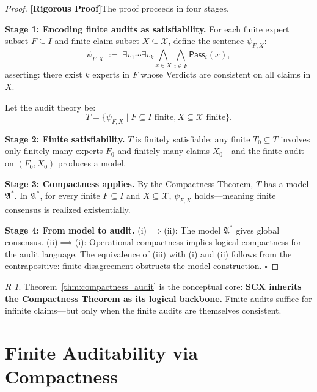 \documentclass[12pt,a4paper]{article}
\theoremstyle{remark}
\newtheorem{remark}[theorem]Remark
\newcommand{\ClaimSpace}{\mathcal{X}}
\newcommand{\Struct}{\mathfrak{A}}
\newcommand{\rigorous}{\textnormal{\textbf{[Rigorous Proof]}}}
\begin{document}
\begin{proof}
\rigorous The proof proceeds in four stages.

\textbf{Stage 1: Encoding finite audits as satisfiability.}
For each finite expert subset \(F \subseteq I\) and finite claim subset \(X \subseteq \ClaimSpace\), define the sentence \(\psi_{F,X}\):
\begin{equation}
    \psi_{F,X} \;:=\; \exists v_1 \cdots \exists v_k
    \bigwedge_{x \in X} \bigwedge_{i \in F} \mathsf{Pass}_i(\underline{x}),
\end{equation}
asserting: there exist \(k\) experts in \(F\) whose Verdicts are consistent on all claims in \(X\).

Let the audit theory be:
\begin{equation}
    T = \{\psi_{F,X} \mid F \subseteq I \text{ finite}, X \subseteq \ClaimSpace \text{ finite}\}.
\end{equation}

\textbf{Stage 2: Finite satisfiability.}
\(T\) is finitely satisfiable: any finite \(T_0 \subseteq T\) involves only finitely many experts \(F_0\) and finitely many claims \(X_0\)---and the finite audit on \((F_0, X_0)\) produces a model.

\textbf{Stage 3: Compactness applies.}
By the Compactness Theorem, \(T\) has a model \(\Struct^*\). In \(\Struct^*\), for every finite \(F \subseteq I\) and \(X \subseteq \ClaimSpace\), \(\psi_{F,X}\) holds---meaning finite consensus is realized existentially.

\textbf{Stage 4: From model to audit.}
(i)\(\implies\)(ii): The model \(\Struct^*\) gives global consensus. (ii)\(\implies\)(i): Operational compactness implies logical compactness for the audit language. The equivalence of (iii) with (i) and (ii) follows from the contrapositive: finite disagreement obstructs the model construction. \(\square\)
\end{proof}
\begin{remark}
Theorem~\ref{thm:compactness_audit} is the conceptual core: \textbf{SCX inherits the Compactness Theorem as its logical backbone.} Finite audits suffice for infinite claims---but only when the finite audits are themselves consistent.
\end{remark}
\section{Finite Auditability via Compactness}
\end{document}
